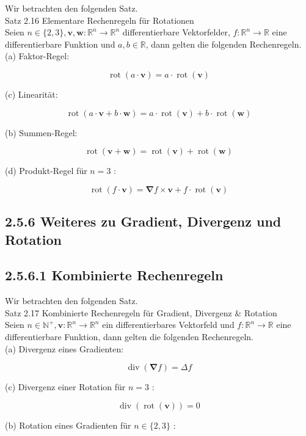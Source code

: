 \documentclass[10pt]{article}
\begin{document}
Wir betrachten den folgenden Satz.\\
Satz 2.16 Elementare Rechenregeln für Rotationen\\
Seien $n \in\{2,3\}, \mathbf{v}, \mathbf{w}: \mathbb{R}^{n} \rightarrow \mathbb{R}^{n}$ differentierbare Vektorfelder, $f: \mathbb{R}^{n} \rightarrow \mathbb{R}$ eine differentierbare Funktion und $a, b \in \mathbb{R}$, dann gelten die folgenden Rechenregeln.\\
(a) Faktor-Regel:

$$
\operatorname{rot}(a \cdot \mathbf{v})=a \cdot \operatorname{rot}(\mathbf{v})
$$

(c) Linearität:

$$
\operatorname{rot}(a \cdot \mathbf{v}+b \cdot \mathbf{w})=a \cdot \operatorname{rot}(\mathbf{v})+b \cdot \operatorname{rot}(\mathbf{w})
$$

(b) Summen-Regel:

$$
\operatorname{rot}(\mathbf{v}+\mathbf{w})=\operatorname{rot}(\mathbf{v})+\operatorname{rot}(\mathbf{w})
$$

(d) Produkt-Regel für $n=3$ :

$$
\operatorname{rot}(f \cdot \mathbf{v})=\boldsymbol{\nabla} f \times \mathbf{v}+f \cdot \operatorname{rot}(\mathbf{v})
$$

\subsection*{2.5.6 Weiteres zu Gradient, Divergenz und Rotation}
\subsection*{2.5.6.1 Kombinierte Rechenregeln}
Wir betrachten den folgenden Satz.\\
Satz 2.17 Kombinierte Rechenregeln für Gradient, Divergenz \& Rotation\\
Seien $n \in \mathbb{N}^{+}, \mathbf{v}: \mathbb{R}^{n} \rightarrow \mathbb{R}^{n}$ ein differentierbares Vektorfeld und $f: \mathbb{R}^{n} \rightarrow \mathbb{R}$ eine differentierbare Funktion, dann gelten die folgenden Rechenregeln.\\
(a) Divergenz eines Gradienten:

$$
\operatorname{div}(\boldsymbol{\nabla} f)=\Delta f
$$

(c) Divergenz einer Rotation für $n=3$ :

$$
\operatorname{div}(\operatorname{rot}(\mathbf{v}))=0
$$

(b) Rotation eines Gradienten für $n \in\{2,3\}$ :
\end{document}
